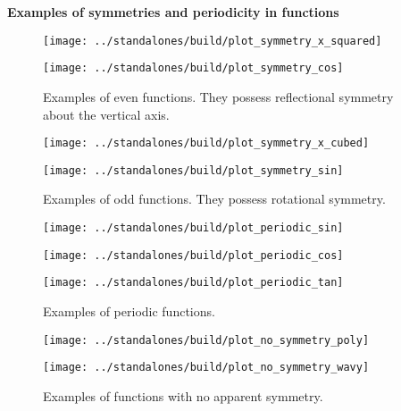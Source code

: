 \documentclass[../main]{subfiles}
\begin{document}
%
%


\noindent\textbf{Examples of symmetries and periodicity in functions}

\begin{figure}[h]  %
  \centering
  \begin{minipage}{.45\textwidth}
    \texttt{[image: ../standalones/build/plot\_symmetry\_x\_squared]}
  \end{minipage}
  \quad
  \begin{minipage}{.45\textwidth}
    \texttt{[image: ../standalones/build/plot\_symmetry\_cos]}
  \end{minipage}
  \caption{Examples of even functions. They possess reflectional symmetry about the vertical axis.}
  \label{fig:even}
\end{figure}

\begin{figure}[h]  %
  \centering
  \begin{minipage}{.45\textwidth}
    \texttt{[image: ../standalones/build/plot\_symmetry\_x\_cubed]}
  \end{minipage}
  \quad
  \begin{minipage}{.45\textwidth}
    \texttt{[image: ../standalones/build/plot\_symmetry\_sin]}
  \end{minipage}
  \caption{Examples of odd functions. They possess rotational symmetry.}
  \label{fig:odd}
\end{figure}

\begin{figure}[h]  %
  \centering
  \centering
  \begin{minipage}{.3\textwidth}
    \texttt{[image: ../standalones/build/plot\_periodic\_sin]}
  \end{minipage}
  \quad
  \begin{minipage}{.3\textwidth}
    \texttt{[image: ../standalones/build/plot\_periodic\_cos]}
  \end{minipage}
  \quad
  \begin{minipage}{.3\textwidth}
    \texttt{[image: ../standalones/build/plot\_periodic\_tan]}
  \end{minipage}
  \caption{Examples of periodic functions.}
  \label{fig:periodic}
\end{figure}

\begin{figure}[h]  %
  \centering
  \begin{minipage}{.45\textwidth}
    \texttt{[image: ../standalones/build/plot\_no\_symmetry\_poly]}
  \end{minipage}
  \quad
  \begin{minipage}{.45\textwidth}
    \texttt{[image: ../standalones/build/plot\_no\_symmetry\_wavy]}
  \end{minipage}
  \caption{Examples of functions with no apparent symmetry.}
  \label{fig:no-symmetry}
\end{figure}
\end{document}
